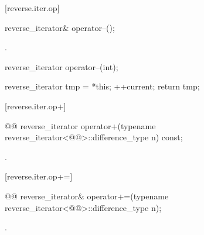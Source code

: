 [reverse.iter.op\dcr]{}

%
\begin{itemdecl}
reverse_iterator& operator--();
\end{itemdecl}

\begin{itemdescr}
\pnum
\effects
{}

\pnum
\returns
{}.
\end{itemdescr}

%
%
\begin{itemdecl}
reverse_iterator operator--(int);
\end{itemdecl}

\begin{itemdescr}
\pnum
\effects
\begin{codeblock}
reverse_iterator tmp = *this;
++current;
return tmp;
\end{codeblock}
\end{itemdescr}

[reverse.iter.op+]{}

%
\begin{itemdecl}
@@
reverse_iterator
operator+(typename reverse_iterator<@@>::difference_type n) const;
\end{itemdecl}

\begin{itemdescr}
\pnum
\returns
{}.
\end{itemdescr}

[reverse.iter.op+=]{}

%
\begin{itemdecl}
@@
reverse_iterator&
operator+=(typename reverse_iterator<@@>::difference_type n);
\end{itemdecl}

\begin{itemdescr}
\pnum
\effects
{}

\pnum
\returns
{}.
\end{itemdescr}

